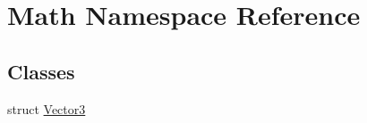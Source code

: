 \hypertarget{namespace_math}{\section{Math Namespace Reference}
\label{namespace_math}
}
\subsection*{Classes}
\begin{DoxyCompactItemize}
\item 
struct \hyperlink{struct_math_1_1_vector3}{Vector3}
\end{DoxyCompactItemize}
